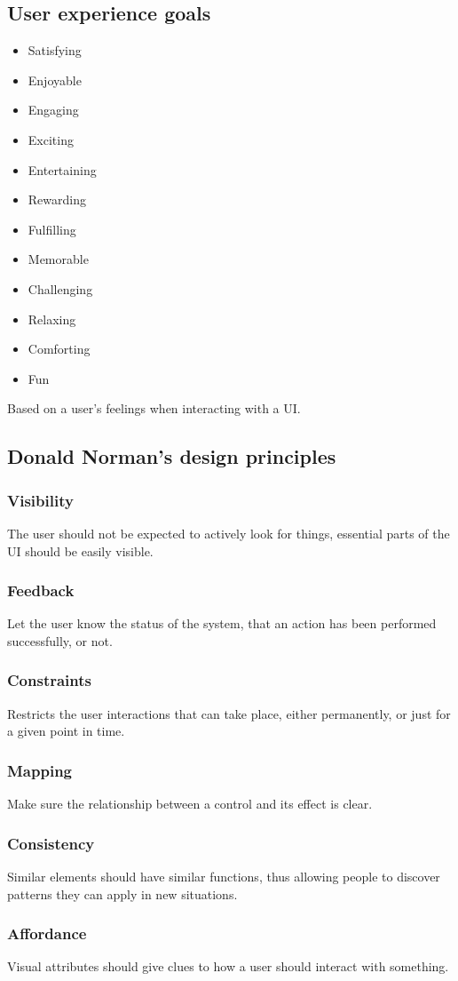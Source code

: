 \subsection{User experience goals}
\begin{itemize}
    \item Satisfying
    \item Enjoyable
    \item Engaging
    \item Exciting
    \item Entertaining
    \item Rewarding
    \item Fulfilling
    \item Memorable
    \item Challenging
    \item Relaxing
    \item Comforting
    \item Fun
\end{itemize}

Based on a user's feelings when interacting with a UI.\ 

\subsection{Donald Norman's design principles}
\subsubsection{Visibility}
The user should not be expected to actively look for things, essential parts of the UI should be easily visible.

\subsubsection{Feedback}
Let the user know the status of the system, that an action has been performed successfully, or not.

\subsubsection{Constraints}
Restricts the user interactions that can take place, either permanently, or just for a given point in time.

\subsubsection{Mapping}
Make sure the relationship between a control and its effect is clear.

\subsubsection{Consistency}
Similar elements should have similar functions, thus allowing people to discover patterns they can
apply in new situations.

\subsubsection{Affordance}
Visual attributes should give clues to how a user should interact with something.